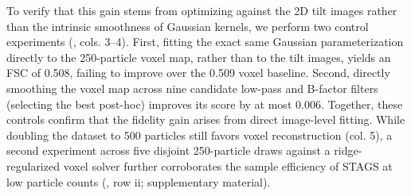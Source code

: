 To verify that this gain stems from optimizing against the 2D tilt images rather than the intrinsic smoothness of Gaussian kernels, we perform two control experiments (, cols. 3–4). First, fitting the exact same Gaussian parameterization directly to the 250-particle voxel map, rather than to the tilt images, yields an FSC of 0.508, failing to improve over the 0.509 voxel baseline. Second, directly smoothing the voxel map across nine candidate low-pass and B-factor filters (selecting the best post-hoc) improves its score by at most 0.006. Together, these controls confirm that the fidelity gain arises from direct image-level fitting. While doubling the dataset to 500 particles still favors voxel reconstruction (col. 5), a second experiment across five disjoint 250-particle draws against a ridge-regularized voxel solver further corroborates the sample efficiency of STAGS at low particle counts (, row ii; supplementary material).%

